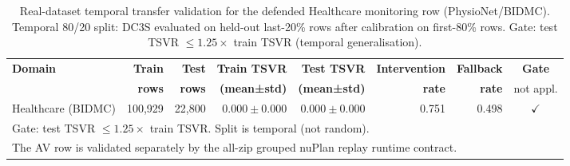 \begin{table}[htbp]
\centering\small
\caption{Real-dataset temporal transfer validation for the defended Healthcare monitoring row (PhysioNet/BIDMC). Temporal 80/20 split: DC3S evaluated on held-out last-20\% rows after calibration on first-80\% rows. Gate: test TSVR $\leq 1.25\times$ train TSVR (temporal generalisation).}
\label{tab:real_data_transfer}
\begin{tabular}{lrrrrrrc}
\toprule
\textbf{Domain} & \textbf{Train} & \textbf{Test} & \textbf{Train TSVR} & \textbf{Test TSVR} & \textbf{Intervention} & \textbf{Fallback} & \textbf{Gate} \\
 & \textbf{rows} & \textbf{rows} & \textbf{(mean±std)} & \textbf{(mean±std)} & \textbf{rate} & \textbf{rate} & not appl. \\
\midrule
Healthcare (BIDMC) & 100,929 & 22,800 & $0.000\pm0.000$ & $0.000\pm0.000$ & 0.751 & 0.498 & $\checkmark$ \\
\bottomrule
\multicolumn{8}{l}{\small Gate: test TSVR $\leq 1.25\times$ train TSVR. Split is temporal (not random).}\\
\multicolumn{8}{l}{\small The AV row is validated separately by the all-zip grouped nuPlan replay runtime contract.}\\
\end{tabular}
\end{table}

